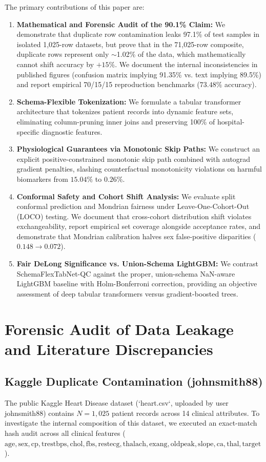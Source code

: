 \documentclass[journal]{IEEEtran}
\begin{document}
The primary contributions of this paper are:
\begin{enumerate}
    \item \textbf{Mathematical and Forensic Audit of the 90.1\% Claim:} We demonstrate that duplicate row contamination leaks 97.1\% of test samples in isolated 1,025-row datasets, but prove that in the 71,025-row composite, duplicate rows represent only $\sim$1.02\% of the data, which mathematically cannot shift accuracy by $+15\%$. We document the internal inconsistencies in published figures (confusion matrix implying 91.35\% vs. text implying 89.5\%) and report empirical 70/15/15 reproduction benchmarks ($73.48\%$ accuracy).
    \item \textbf{Schema-Flexible Tokenization:} We formulate a tabular transformer architecture that tokenizes patient records into dynamic feature sets, eliminating column-pruning inner joins and preserving 100\% of hospital-specific diagnostic features.
    \item \textbf{Physiological Guarantees via Monotonic Skip Paths:} We construct an explicit positive-constrained monotonic skip path combined with autograd gradient penalties, slashing counterfactual monotonicity violations on harmful biomarkers from $15.04\%$ to $0.26\%$.
    \item \textbf{Conformal Safety and Cohort Shift Analysis:} We evaluate split conformal prediction and Mondrian fairness under Leave-One-Cohort-Out (LOCO) testing. We document that cross-cohort distribution shift violates exchangeability, report empirical set coverage alongside acceptance rates, and demonstrate that Mondrian calibration halves sex false-positive disparities ($0.148 \to 0.072$).
    \item \textbf{Fair DeLong Significance vs. Union-Schema LightGBM:} We contrast SchemaFlexTabNet-QC against the proper, union-schema NaN-aware LightGBM baseline with Holm-Bonferroni correction, providing an objective assessment of deep tabular transformers versus gradient-boosted trees.
\end{enumerate}

\section{Forensic Audit of Data Leakage and Literature Discrepancies}

\subsection{Kaggle Duplicate Contamination (johnsmith88)}
The public Kaggle Heart Disease dataset (`heart.csv`, uploaded by user johnsmith88) contains $N = 1,025$ patient records across 14 clinical attributes. To investigate the internal composition of this dataset, we executed an exact-match hash audit across all clinical features ($\text{age}, \text{sex}, \text{cp}, \text{trestbps}, \text{chol}, \text{fbs}, \text{restecg}, \text{thalach}, \text{exang}, \text{oldpeak}, \text{slope}, \text{ca}, \text{thal}, \text{target}$).
\end{document}
